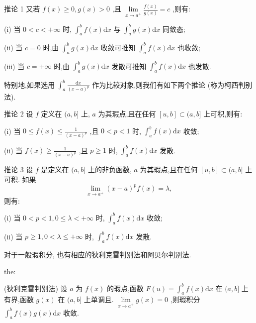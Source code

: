 推论 1 又若 \(f\left( x\right)  \geq  0,g\left( x\right)  > 0\) ,且 \(\mathop{\lim }\limits_{{x \rightarrow  {a}^{ + }}}\frac{f\left( x\right) }{g\left( x\right) } = c\) ,则有:

(i) 当 \(0 < c <  + \infty\) 时, \({\int }_{a}^{b}f\left( x\right) \mathrm{d}x\) 与 \({\int }_{a}^{b}g\left( x\right) \mathrm{d}x\) 同敛态;

(ii) 当 \(c = 0\) 时,由 \({\int }_{a}^{b}g\left( x\right) \mathrm{d}x\) 收敛可推知 \({\int }_{a}^{b}f\left( x\right) \mathrm{d}x\) 也收敛;

(iii) 当 \(c =  + \infty\) 时,由 \({\int }_{a}^{b}g\left( x\right) \mathrm{d}x\) 发散可推知 \({\int }_{a}^{b}f\left( x\right) \mathrm{d}x\) 也发散.

特别地,如果选用 \({\int }_{a}^{b}\frac{\mathrm{d}x}{{\left( x - a\right) }^{p}}\) 作为比较对象,则我们有如下两个推论 (称为柯西判别法).

推论 2 设 \(f\) 定义在 \((a,b\rbrack\) 上, \(a\) 为其瑕点,且在任何 \(\left\lbrack  {u,b}\right\rbrack   \subset  (a,b\rbrack\) 上可积,则有:

(i) 当 \(0 \leq  f\left( x\right)  \leq  \frac{1}{{\left( x - a\right) }^{p}}\) ,且 \(0 < p < 1\) 时, \({\int }_{a}^{b}f\left( x\right) \mathrm{d}x\) 收敛;

(ii) 当 \(f\left( x\right)  \geq  \frac{1}{{\left( x - a\right) }^{p}}\) ,且 \(p \geq  1\) 时, \({\int }_{a}^{b}f\left( x\right) \mathrm{d}x\) 发散.

推论 3 设 \(f\) 是定义在 \((a,b\rbrack\) 上的非负函数, \(a\) 为其瑕点,且在任何 \(\left\lbrack  {u,b}\right\rbrack   \subset  (a,b\rbrack\) 上可积. 如果
\[
\mathop{\lim }\limits_{{x \rightarrow  {a}^{ + }}}{\left( x - a\right) }^{p}f\left( x\right)  = \lambda ,
\]
则有:

(i) 当 \(0 < p < 1,0 \leq  \lambda  <  + \infty\) 时, \({\int }_{a}^{b}f\left( x\right) \mathrm{d}x\) 收敛;

(ii) 当 \(p \geq  1,0 < \lambda  \leq   + \infty\) 时, \({\int }_{a}^{b}f\left( x\right) \mathrm{d}x\) 发散.

对于一般瑕积分, 也有相应的狄利克雷判别法和阿贝尔判别法.

\begin{theorem}{}{the:}

\end{theorem}
 (狄利克雷判别法) 设 \(a\) 为 \(f\left( x\right)\) 的瑕点,函数 \(F\left( u\right)  = {\int }_{a}^{b}f\left( x\right) \mathrm{d}x\) 在 \((a,b\rbrack\) 上有界,函数 \(g\left( x\right)\) 在 \((a,b\rbrack\) 上单调且. \(\mathop{\lim }\limits_{{x \rightarrow  {a}^{ + }}}g\left( x\right)  = 0\) ,则瑕积分 \({\int }_{a}^{b}f\left( x\right) g\left( x\right) \mathrm{d}x\) 收敛.


